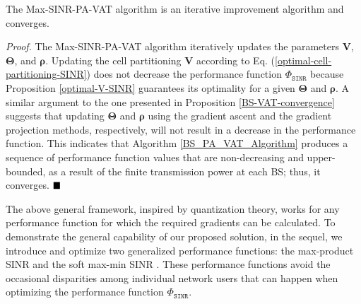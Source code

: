 \begin{Proposition}\label{BS-PA-VAT-convergence}
    The Max-SINR-PA-VAT algorithm is an iterative improvement algorithm and converges.
\end{Proposition}

{\it Proof. } The Max-SINR-PA-VAT algorithm iteratively updates the parameters $\bm{V}$, $\bm{\Theta}$, and $\bm{\rho}$. Updating the cell partitioning $\bm{V}$ according to Eq. (\ref{optimal-cell-partitioning-SINR}) does not decrease the performance function $\Phi_{\mathtt{SINR}}$ because Proposition \ref{optimal-V-SINR} guarantees its optimality for a given $\bm{\Theta}$ and $\bm{\rho}$. A similar argument to the one presented in Proposition \ref{BS-VAT-convergence} suggests that updating $\bm{\Theta}$ and $\bm{\rho}$ using the gradient ascent and the gradient projection methods, respectively, will not result in a decrease in the performance function. This indicates that Algorithm \ref{BS_PA_VAT_Algorithm} produces a sequence of performance function values that are non-decreasing and upper-bounded, as a result of the finite transmission power at each BS; thus, it converges. $\hfill\blacksquare$

The above general framework, inspired by quantization theory, works for any performance function for which the required gradients can be calculated. To demonstrate the general capability of our proposed solution, in the sequel, we introduce and optimize two generalized performance functions: the max-product SINR and the soft max-min SINR \cite{nikbakht2020unsupervised}. These performance functions avoid the occasional disparities among individual network users that can happen when optimizing the performance function $\Phi_{\mathtt{SINR}}$.





